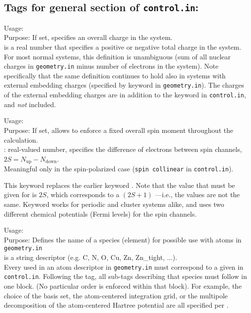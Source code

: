 \newpage

\subsection*{Tags for general section of \texttt{control.in}:}

{
 \noindent
 Usage:   \\[1.0ex]
 Purpose: If set, specifies an overall charge in the system. \\[1.0ex]
  is a real number that specifies a positive or negative total
   charge in the system. \\
}
For most normal systems, this definition is unambiguous (sum of all nuclear
charges in \texttt{geometry.in} minus number of electrons in the system). Note
specifically that the same definition continues to hold also in systems with
external embedding charges (specified by keyword  in
\texttt{geometry.in}). The charges of the external embedding charges are in
addition to the  keyword in \texttt{control.in}, and
\emph{not} included.

{
 \noindent
 Usage:   \\[1.0ex]
 Purpose: If set, allows to enforce a fixed overall spin moment throughout the calculation. \\[1.0ex]
   : real-valued number, specifies the difference of electrons
  between spin channels, $2S = N_\text{up}-N_\text{down}$. \\ 
} 
Meaningful only in the spin-polarized case (\texttt{spin collinear} in
\texttt{control.in}). 

This keyword replaces the earlier keyword
. Note that the value that must be given for
 is $2S$, which corresponds to a
 $(2S+1)$ ---i.e., the values are not the same.
Keyword  works for periodic and cluster
systems alike, and uses two different chemical potentials (Fermi
levels) for the spin channels.

{
  \noindent
  Usage:   \\[1.0ex]
  Purpose: Defines the name of a species (element) for possible use with atoms
    in \texttt{geometry.in}\\[1.0ex] 
   is a string descriptor (e.g. C, N, O, Cu, Zn,
    Zn\_tight, ...). \\
}
Every  used in an atom descriptor in
\texttt{geometry.in} must correspond to a 
given in \texttt{control.in}. Following the  tag, all
sub-tags describing that species must follow in one block. (No particular
order is enforced within that block). For example, the choice of the basis
set, the atom-centered integration grid, or the multipole decomposition of
the atom-centered Hartree potential are all specified per . 

